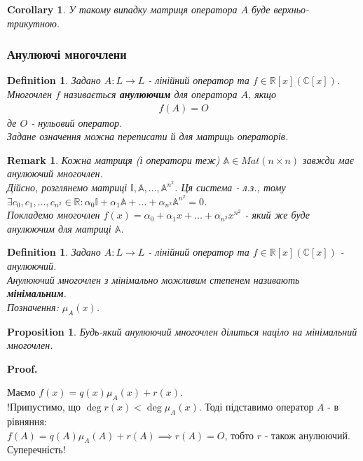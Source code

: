 \documentclass[a4paper, 10pt]{article}
\makeatletter
\theoremstyle{theoremdd}
\newtheorem{definition}[theorem]{Definition}
\newtheorem{proposition}[theorem]{Proposition}
\newtheorem{remark}[theorem]{Remark}
\newtheorem{corollary}[theorem]{Corollary}
\renewenvironment{proof}[1][Proof.\\]{\par
\pushQED{\hfill \qed}%
\normalfont \topsep6\p@\@plus6\p@\relax
\trivlist
\item\relax
{\bfseries
#1\@addpunct{.}}\hspace\labelsep\ignorespaces
}{%
\popQED\endtrivlist\@endpefalse
}
\makeatother
\begin{document}
\begin{corollary}
У такому випадку матриця оператора $A$ буде верхньо-трикутною.
\end{corollary}
\fi

\iffalse
\subsubsection*{Анулюючі многочлени}
\begin{definition}
Задано $A: L \to L$ - лінійний оператор та $f \in \mathbb{R}[x] (\mathbb{C}[x])$.\\
Многочлен $f$ називається \textbf{анулюючим} для оператора $A$, якщо
\begin{align*}
f(A) = O
\end{align*}
де $O$ - нульовий оператор.\\
Задане означення можна переписати й для матриць операторів.
\end{definition}

\begin{remark}
Кожна матриця (і оператори теж) $\mathbb{A} \in Mat(n \times n)$ завжди має анулюючий многочлен.\\
Дійсно, розглянемо матриці $\mathbb{I}, \mathbb{A}, \dots, \mathbb{A}^{n^2}$. Ця система - л.з., тому\\
$\exists c_0,c_1,\dots,c_{n^2} \in \mathbb{R}: \alpha_0 \mathbb{I} + \alpha_1 \mathbb{A} + \dots + \alpha_{n^2} \mathbb{A}^{n^2} = 0$.\\
Покладемо многочлен $f(x) = \alpha_0 + \alpha_1 x + \dots + \alpha_{n^2}x^{n^2}$ - який же буде анулюючим для матриці $\mathbb{A}$.
\end{remark}

\begin{definition}
Задано $A: L \to L$ - лінійний оператор та $f \in \mathbb{R}[x] (\mathbb{C}[x])$ - анулюючий.\\
Анулюючий многочлен з мінімально можливим степенем називають \textbf{мінімальним}.\\
Позначення: $\mu_A(x)$.
\end{definition}

\begin{proposition}
Будь-який анулюючий многочлен ділиться націло на мінімальний многочлен.
\end{proposition}

\begin{proof}
Маємо $f(x) = q(x) \mu_A(x) + r(x)$.\\
!Припустимо, що $\deg r(x) < \deg \mu_A(x)$. Тоді підставимо оператор $A$ - в рівняння:\\
$f(A) = q(A) \mu_A(A) + r(A) \implies r(A) = O$, тобто $r$ - також анулюючий. Суперечність!
\end{proof}
\end{document}
